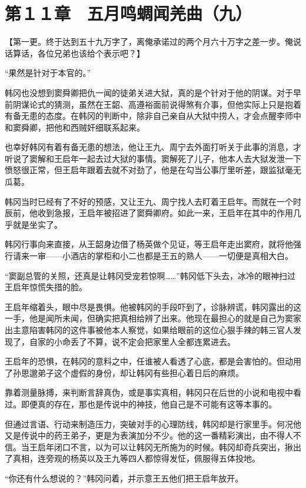 \section{第１１章　五月鸣蜩闻羌曲（九）}

【第一更。终于达到五十九万字了，离俺承诺过的两个月六十万字之差一步。俺说话算话，各位兄弟也该给个表示吧？】

“果然是针对于本官的。”

韩冈也没想到窦舜卿把仇一闻的徒弟关进大狱，真的是个针对于他的阴谋。对于早前阴谋论式的猜测，虽然在王韶、高遵裕面前说得煞有介事，但他实际上只是抱着有备无患的态度。在韩冈的判断中，除非自己亲自从大狱中捞人，才会点醒李师中和窦舜卿，把他和西贼奸细联系起来。

也幸好韩冈有着有备无患的想法，他让王九、周宁去外面打听关于此事的消息，才听说了窦解和王启年一起去过大狱的事情。窦解死了儿子，他本人去大狱发泄一下愤怒很正常，但王启年跟着去就不对劲了，他是在勾当公事厅里听差，跟监狱毫无瓜葛。

韩冈当时已经有了不好的预感，又让王九、周宁找人去盯着王启年。而就在一个时辰前，他收到急报，王启年被招进了窦舜卿府。如此一来，王启年在其中的作用几乎就是坐实了。

韩冈行事向来直接，从王韶身边借了杨英做个见证，等王启年走出窦府，就将他强行请来一审——小酒店的掌柜和小二也都是王五的熟人——一切便是真相大白。

“窦副总管的关照，还真是让韩冈受宠若惊啊……”韩冈低下头去，冰冷的眼神扫过王启年惊慌失措的脸。

王启年缩着头，眼中尽是畏惧。他被韩冈的手段吓到了，诊脉辨谎，韩冈露出的这一手，他是闻所未闻，但确实把真相给辨了出来。他现在最担心的就是自己为窦家出主意陷害韩冈的这件事被他本人察觉，如果给眼前的这位心狠手辣的韩三官人发现了，自家的小命丢了不算，说不定会把家里人全都连累进去。

王启年的恐惧，在韩冈的意料之中，任谁被人看透了心底，都是会害怕的。但动用了孙思邈弟子这个虚假的身份，却让韩冈有些担心着日后的麻烦。

靠着测量脉搏，来判断言辞真伪，或是事实真相，韩冈只在后世的小说和电视中看过。即便真的存在，那也是传说中的神技，他自己是不可能有这等本事的。

但通过言语、行动来制造压力，突破对手的心理防线，韩冈却是行家里手。何况他又是传说中的药王弟子，更是为表演加分不少。他的这一番精彩演出，由不得人不信。当王启年闭口不言，以为可以让韩冈无所施为的时候。韩冈却奇兵突出，揪出了真相，连旁观的杨英以及王九等四人都惊得发怔，佩服得五体投地。

“你还有什么想说的？”韩冈问着，并示意王五他们把王启年放开。

